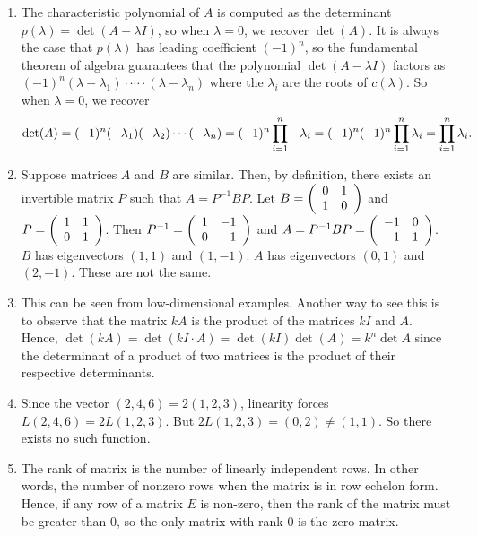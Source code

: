 \documentclass{ximera}
\begin{document}
\begin{exercise}
\begin{solution}
\begin{enumerate}
\item The characteristic polynomial of $A$ is computed as the determinant $p(\lambda)=\det(A-\lambda I)$, so when $\lambda=0$, we recover $\det(A)$. It is always the case that $p(\lambda)$ has leading coefficient $(-1)^n$, so the fundamental theorem of algebra guarantees that the polynomial $\det(A-\lambda I)$ factors as $(-1)^n (\lambda-\lambda_1)\cdot \cdots\cdot (\lambda-\lambda_n)$ where the $\lambda_i$ are the roots of $c(\lambda)$. So when $\lambda=0$, we recover 
\[
\det(A)=(-1)^n (-\lambda_1)(-\lambda_2)\cdots(-\lambda_n)=(-1)^n\prod_{i=1}^{n}-\lambda_i =(-1)^n (-1)^n\prod_{i=1}^{n}\lambda_i=\prod_{i=1}^{n}\lambda_i\ldotp
\]
\item Suppose matrices $A$ and $B$ are similar. Then, by definition, there exists an invertible matrix $P$ such that $A=P^{-1}BP$. Let $B=\left(\begin{array}{rrrrrrrrrrrrrrrrrr}  0 & 1 \\ 1 & 0 \end{array}\right)$ and $P=\left(\begin{array}{rrrrrrrrrrrrrrrrrr}  1 & 1 \\ 0 & 1 \end{array}\right)$. Then $P^{-1}=\left(\begin{array}{rrrrrrrrrrrrrrrrrr}  1 & -1 \\ 0 & 1 \end{array}\right)$ and $A=P^{-1}BP=\left(\begin{array}{rrrrrrrrrrrrrrrrrr}  -1 & 0 \\ 1 & 1 \end{array}\right)$. $B$ has eigenvectors $(1,1)$ and $(1,-1)$. $A$ has eigenvectors $(0,1)$ and $(2,-1)$. These are not the same. 
\item This can be seen from low-dimensional examples. Another way to see this is to observe that the matrix $kA$ is the product of the matrices $kI$ and $A$. Hence, $\det(kA)=\det (kI\cdot A)=\det (kI)\det (A)=k^{n}\det A$ since the determinant of a product of two matrices is the product of their respective determinants.
\item Since the vector $(2,4,6)=2(1,2,3)$, linearity forces $L(2,4,6)=2L(1,2,3)$. But $2L(1,2,3)=(0,2)\ne (1,1)$. So there exists no such function.
\item The rank of matrix is the number of linearly independent rows. In other words, the number of nonzero rows when the matrix is in row echelon form. Hence, if any row of a matrix $E$ is non-zero, then the rank of the matrix must be greater than $0$, so the only matrix with rank $0$ is the zero matrix. 
\end{enumerate}



  
\end{solution}
\end{exercise}
\end{document}
